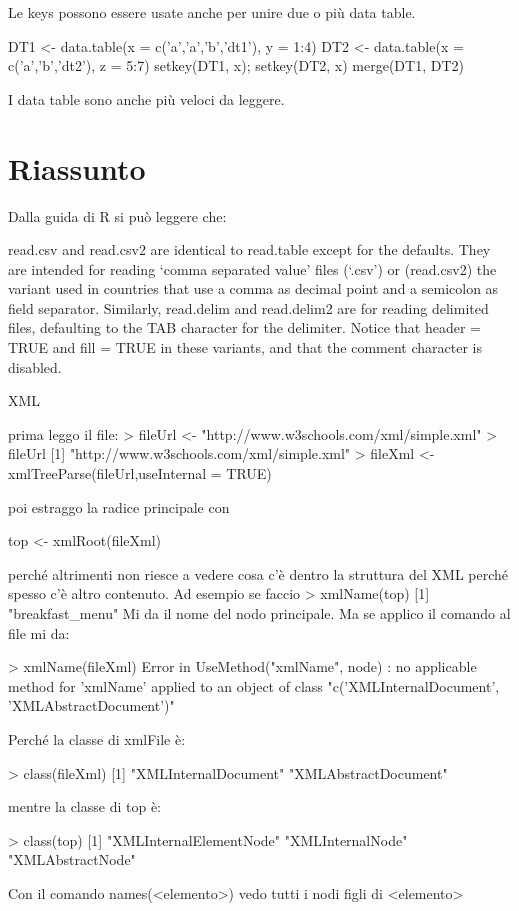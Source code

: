 Le keys possono essere usate anche per unire due o più data table.

DT1 <- data.table(x = c('a','a','b','dt1'), y = 1:4)
DT2 <- data.table(x = c('a','b','dt2'), z = 5:7)
setkey(DT1, x); setkey(DT2, x)
merge(DT1, DT2)


I data table sono anche più veloci da leggere.



\section{Riassunto}

Dalla guida di R si può leggere che:

read.csv and read.csv2 are identical to read.table except for the defaults. They are intended for reading ‘comma separated value’ files (‘.csv’) or (read.csv2) the variant used in countries that use a comma as decimal point and a semicolon as field separator. Similarly, read.delim and read.delim2 are for reading delimited files, defaulting to the TAB character for the delimiter. Notice that header = TRUE and fill = TRUE in these variants, and that the comment character is disabled.


XML

prima leggo il file:
> fileUrl <- "http://www.w3schools.com/xml/simple.xml"
> fileUrl
[1] "http://www.w3schools.com/xml/simple.xml"
> fileXml <- xmlTreeParse(fileUrl,useInternal = TRUE)

poi estraggo la radice principale con

top <- xmlRoot(fileXml)

perché altrimenti non riesce a vedere cosa c'è dentro la struttura del XML perché spesso c'è altro contenuto.
Ad esempio se faccio 
> xmlName(top)
[1] "breakfast_menu"
Mi da il nome del nodo principale. Ma se applico il comando al file mi da:

> xmlName(fileXml)
Error in UseMethod("xmlName", node) : 
  no applicable method for 'xmlName' applied to an object of class "c('XMLInternalDocument', 'XMLAbstractDocument')"

Perché la classe di xmlFile è:

> class(fileXml)
[1] "XMLInternalDocument" "XMLAbstractDocument"


mentre la classe di top è:

> class(top)
[1] "XMLInternalElementNode" "XMLInternalNode"        "XMLAbstractNode" 

Con il comando names(<elemento>) vedo tutti i nodi figli di <elemento>

